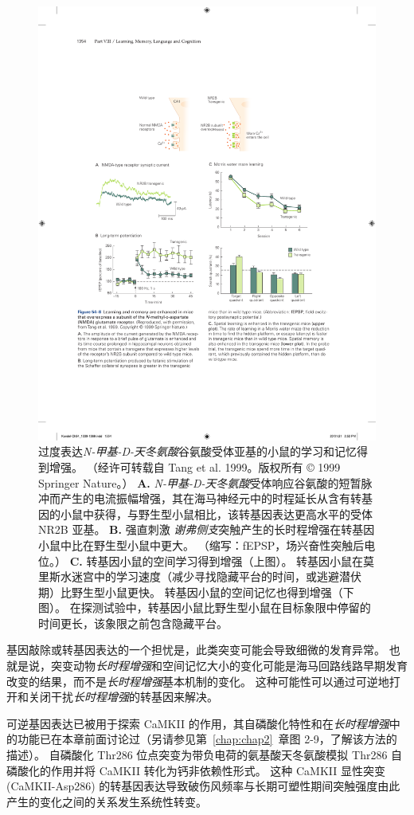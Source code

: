\begin{figure}[htbp]
	\centering
	\includegraphics[width=0.75\linewidth]{chap54/fig_54_8}
	\caption{过度表达\textit{N-甲基-D-天冬氨酸}谷氨酸受体亚基的小鼠的学习和记忆得到增强。
		（经许可转载自 Tang et al. 1999。版权所有 © 1999 Springer Nature。）
		\textbf{A.} \textit{N-甲基-D-天冬氨酸}受体响应谷氨酸的短暂脉冲而产生的电流振幅增强，其在海马神经元中的时程延长从含有转基因的小鼠中获得，与野生型小鼠相比，该转基因表达更高水平的受体 NR2B 亚基。
		\textbf{B.} 强直刺激 \textit{谢弗侧支}突触产生的长时程增强在转基因小鼠中比在野生型小鼠中更大。
		（缩写：fEPSP，场兴奋性突触后电位。）
		\textbf{C.} 转基因小鼠的空间学习得到增强（上图）。
		转基因小鼠在莫里斯水迷宫中的学习速度（减少寻找隐藏平台的时间，或逃避潜伏期）比野生型小鼠更快。
		转基因小鼠的空间记忆也得到增强（下图）。
		在探测试验中，转基因小鼠比野生型小鼠在目标象限中停留的时间更长，该象限之前包含隐藏平台。}
	\label{fig:54_8}
\end{figure}


基因敲除或转基因表达的一个担忧是，此类突变可能会导致细微的发育异常。
也就是说，突变动物\textit{长时程增强}和空间记忆大小的变化可能是海马回路线路早期发育改变的结果，而不是\textit{长时程增强}基本机制的变化。
这种可能性可以通过可逆地打开和关闭干扰\textit{长时程增强}的转基因来解决。


可逆基因表达已被用于探索 CaMKII 的作用，其自磷酸化特性和在\textit{长时程增强}中的功能已在本章前面讨论过（另请参见第~\ref{chap:chap2}~章图 2-9，了解该方法的描述）。
自磷酸化 Thr286 位点突变为带负电荷的氨基酸天冬氨酸模拟 Thr286 自磷酸化的作用并将 CaMKII 转化为钙非依赖性形式。
这种 CaMKII 显性突变 (CaMKII-Asp286) 的转基因表达导致破伤风频率与长期可塑性期间突触强度由此产生的变化之间的关系发生系统性转变。


